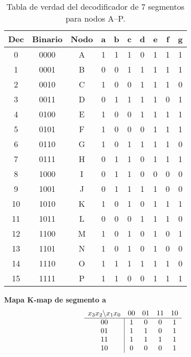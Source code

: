 \documentclass[12pt]{article}
\begin{document}

\begin{table}[ht]
\centering
\begin{tabular}{|c|c|c||c|c|c|c|c|c|c|}
\hline
\textbf{Dec} & \textbf{Binario} & \textbf{Nodo} 
  & \textbf{a} & \textbf{b} & \textbf{c} & \textbf{d} & \textbf{e} & \textbf{f} & \textbf{g} \\
\hline
0  & 0000 & A & 1 & 1 & 1 & 0 & 1 & 1 & 1 \\  
1  & 0001 & B & 0 & 0 & 1 & 1 & 1 & 1 & 1 \\  
2  & 0010 & C & 1 & 0 & 0 & 1 & 1 & 1 & 0 \\  
3  & 0011 & D & 0 & 1 & 1 & 1 & 1 & 0 & 1 \\  
4  & 0100 & E & 1 & 0 & 0 & 1 & 1 & 1 & 1 \\  
5  & 0101 & F & 1 & 0 & 0 & 0 & 1 & 1 & 1 \\  
6  & 0110 & G & 1 & 0 & 1 & 1 & 1 & 1 & 0 \\  
7  & 0111 & H & 0 & 1 & 1 & 0 & 1 & 1 & 1 \\  
8  & 1000 & I & 0 & 1 & 1 & 0 & 0 & 0 & 0 \\  
9  & 1001 & J & 0 & 1 & 1 & 1 & 1 & 0 & 0 \\  
10 & 1010 & K & 1 & 0 & 1 & 0 & 1 & 1 & 1 \\  
11 & 1011 & L & 0 & 0 & 0 & 1 & 1 & 1 & 0 \\  
12 & 1100 & M & 1 & 0 & 1 & 0 & 1 & 0 & 1 \\  
13 & 1101 & N & 1 & 0 & 1 & 0 & 1 & 0 & 0 \\  
14 & 1110 & O & 1 & 1 & 1 & 1 & 1 & 1 & 0 \\  
15 & 1111 & P & 1 & 1 & 0 & 0 & 1 & 1 & 1 \\  
\hline
\end{tabular}
\caption{Tabla de verdad del decodificador de 7 segmentos para nodos A–P.}
\label{tab:7seg_decoder}
\end{table}

\bigskip

\noindent
\textbf{Mapa K‐map de segmento \textsf{a}}  
\[
\begin{array}{c|cccc}
\multicolumn{1}{c}{x_3x_2 \backslash x_1x_0} & 00 & 01 & 11 & 10 \\
\hline
00 & 1 & 0 & 0 & 1 \\
01 & 1 & 1 & 0 & 1 \\
11 & 1 & 1 & 1 & 1 \\
10 & 0 & 0 & 0 & 1 \\
\end{array}
\]
\vspace{1em}
\end{document}
